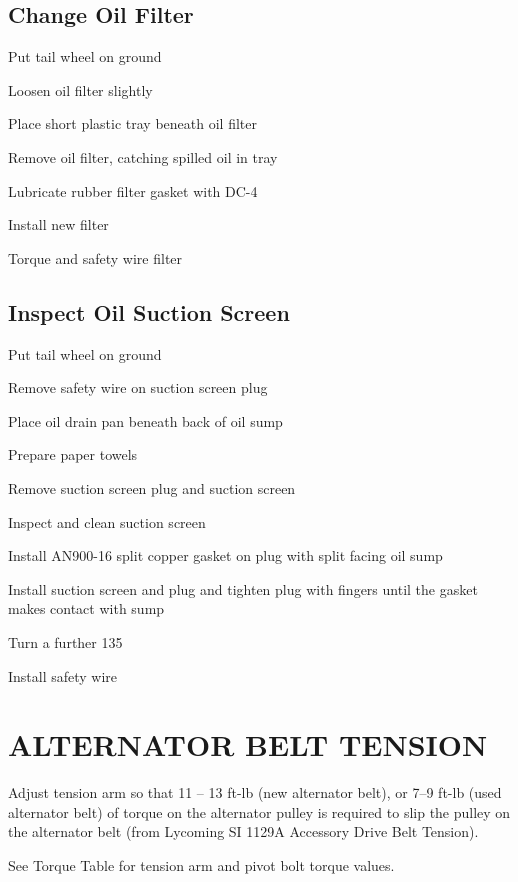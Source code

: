 \subsection{Change Oil Filter}
\begin{enumerate*}
    \item Put tail wheel on ground
    \item Loosen oil filter slightly
    \item Place short plastic tray beneath oil filter
    \item Remove oil filter, catching spilled oil in tray
    \item Lubricate rubber filter gasket with DC-4
    \item Install new filter
    \item Torque and safety wire filter
\end{enumerate*}

\subsection{Inspect Oil Suction Screen}
\begin{enumerate*}
    \item Put tail wheel on ground
    \item Remove safety wire on suction screen plug
    \item Place oil drain pan beneath back of oil sump
    \item Prepare paper towels
    \item Remove suction screen plug and suction screen
    \item Inspect and clean suction screen
    \item Install AN900-16 split copper gasket on plug with split facing oil sump
    \item Install suction screen and plug and tighten plug with fingers until the gasket makes contact with sump
    \item Turn a further 135 \textdegree
    \item Install safety wire
\end{enumerate*}

\section{ALTERNATOR BELT TENSION} 
\begin{enumerate*}
	\item Adjust tension arm so that 11 -- 13 ft-lb (new alternator belt), or 7--9 ft-lb (used alternator belt) of torque on the alternator pulley is required to slip the pulley on the alternator belt (from Lycoming SI 1129A Accessory Drive Belt Tension). 
	\item See Torque Table for tension arm and pivot bolt torque values. 
\end{enumerate*}

